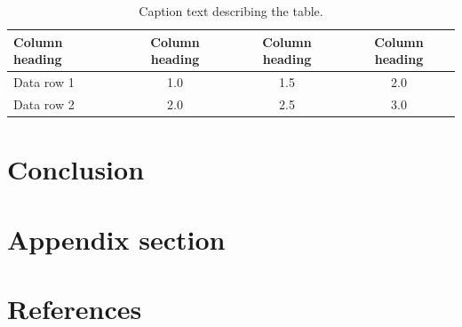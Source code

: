 \documentclass{iopjournal}
\begin{document}
\begin{table}
	\caption{Caption text describing the table.}
	\centering
	\begin{tabular}{l c c c}
		\hline
		Column heading & Column heading & Column heading & Column heading \\
		\hline
		Data row 1     & 1.0            & 1.5            & 2.0            \\
		Data row 2     & 2.0            & 2.5            & 3.0            \\
		\hline
	\end{tabular}
	\label{tab:example}
\end{table}

\section{Conclusion}

\lipsum[4]






\appendix
\section{Appendix section}

\lipsum[5]

\section*{References}


\end{document}
